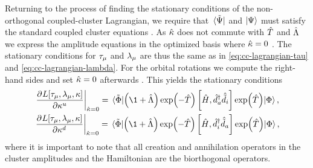             Returning to the process of finding the stationary conditions of the
            non-orthogonal coupled-cluster Lagrangian, we require that
            $\bra*{\tilde{\Psi}}$ and $\ket{\Psi}$ must satisfy the standard
            coupled cluster equations \cite{rolf-nocc}.
            As $\hat{\kappa}$ does not commute with $\hat{T}$ and $\hat{\Lambda}$ we express
            the amplitude equations in the optimized basis where $\hat{\kappa} = 0$
            \cite{ugur-occ, rolf-nocc}.
            The stationary conditions for $\tau_{\mu}$ and
            $\lambda_{\mu}$ are thus the same as in
            \autoref{eq:cc-lagrangian-tau} and
            \autoref{eq:cc-lagrangian-lambda}.
            For the orbital rotations we compute the right-hand sides and set
            $\hat{\kappa} = 0$ afterwards \cite{ugur-occ}.
            This yields the stationary conditions
            \begin{gather}
                \left.
                \dpd{L[\clustamp_{\mu}, \clustlamp_{\mu}, \noccten]}{
                    {\noccten^{u}}
                }
                \right\rvert_{\nocc = 0}
                = \mel*{\tilde{\slat}}{
                    \para{\1 + \clustl}
                    \exp(-\clust)
                    \com{\hamil}{\biccr{a}\bican{i}}
                    \exp(\clust)
                }{\slat},
                \label{eq:nocc-kappa-up-rhs}
                \\
                \left.
                \dpd{L[\clustamp_{\mu}, \clustlamp_{\mu}, \noccten]}{
                    {\noccten^{d}}
                }
                \right\rvert_{\nocc = 0}
                = \mel*{\tilde{\slat}}{
                    \para{\1 + \clustl}
                    \exp(-\clust)
                    \com{\hamil}{\biccr{i}\bican{a}}
                    \exp(\clust)
                }{\slat},
                \label{eq:nocc-kappa-down-rhs}
            \end{gather}
            where it is important to note that all creation and annihilation
            operators in the cluster amplitudes and the Hamiltonian are the
            biorthogonal operators.

